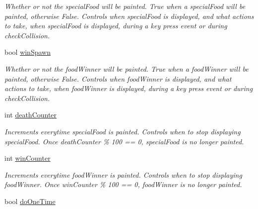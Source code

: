 \begin{DoxyCompactItemize}
\begin{DoxyCompactList}\small\item\em \-Whether or not the special\-Food will be painted. \-True when a special\-Food will be painted, otherwise \-False. \-Controls when special\-Food is displayed, and what actions to take, when special\-Food is displayed, during a key press event or during check\-Collision. \end{DoxyCompactList}\item 
\hypertarget{classGame_a5c937032c95deccc527887635cc2ac57}{bool \hyperlink{classGame_a5c937032c95deccc527887635cc2ac57}{win\-Spawn}}\label{classGame_a5c937032c95deccc527887635cc2ac57}

\begin{DoxyCompactList}\small\item\em \-Whether or not the food\-Winner will be painted. \-True when a food\-Winner will be painted, otherwise \-False. \-Controls when food\-Winner is displayed, and what actions to take, when food\-Winner is displayed, during a key press event or during check\-Collision. \end{DoxyCompactList}\item 
\hypertarget{classGame_a2f69ee950ab7ae5ac9df9549aac3458e}{int \hyperlink{classGame_a2f69ee950ab7ae5ac9df9549aac3458e}{death\-Counter}}\label{classGame_a2f69ee950ab7ae5ac9df9549aac3458e}

\begin{DoxyCompactList}\small\item\em \-Increments everytime special\-Food is painted. \-Controls when to stop displaying special\-Food. \-Once death\-Counter \% 100 == 0, special\-Food is no longer painted. \end{DoxyCompactList}\item 
\hypertarget{classGame_ad1b4ed65c72b1b35259c52f0d7246dd5}{int \hyperlink{classGame_ad1b4ed65c72b1b35259c52f0d7246dd5}{win\-Counter}}\label{classGame_ad1b4ed65c72b1b35259c52f0d7246dd5}

\begin{DoxyCompactList}\small\item\em \-Increments everytime food\-Winner is painted. \-Controls when to stop displaying food\-Winner. \-Once win\-Counter \% 100 == 0, food\-Winner is no longer painted. \end{DoxyCompactList}\item 
\hypertarget{classGame_a0b895214583cabcae16d9d1be5a00aab}{bool \hyperlink{classGame_a0b895214583cabcae16d9d1be5a00aab}{do\-One\-Time}}\label{classGame_a0b895214583cabcae16d9d1be5a00aab}


\end{DoxyCompactItemize}
